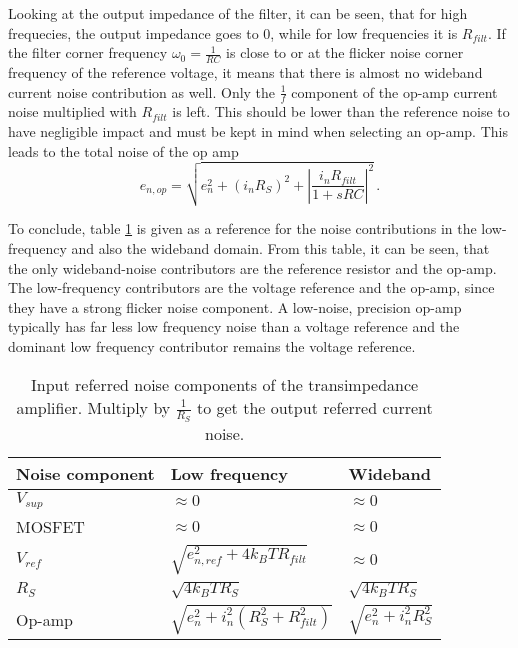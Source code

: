 Looking at the output impedance of the filter, it can be seen, that for high frequecies, the output impedance goes to \num{0}, while for low frequencies it is $R_{filt}$. If the filter corner frequency $\omega_0 = \frac{1}{RC}$ is close to or at the flicker noise corner frequency of the reference voltage, it means that there is almost no wideband current noise contribution as well. Only the $\frac{1}{f}$ component of the op-amp current noise multiplied with $R_{filt}$ is left. This should be lower than the reference noise to have negligible impact and must be kept in mind when selecting an op-amp.
This leads to the total noise of the op amp
\begin{equation}
    e_{n,op} = \sqrt{e_n^2 + (i_n R_S)^2 + \left|\frac{i_n R_{filt}}{1+sRC}\right|^2} \,.
\end{equation}

To conclude, table \ref{tab:current_source_noise_contributers} is given as a reference for the noise contributions in the low-frequency and also the wideband domain. From this table, it can be seen, that the only wideband-noise contributors are the reference resistor and the op-amp. The low-frequency contributors are the voltage reference and the op-amp, since they have a strong flicker noise component. A low-noise, precision op-amp typically has far less low frequency noise than a voltage reference and the dominant low frequency contributor remains the voltage reference.

\begin{table}[ht]
    \centering
    \begin{tabular}{lll}
        \toprule
        Noise component& Low frequency& Wideband \\
        \midrule
        $V_{sup}$ & $\approx 0$ & $\approx 0$\\
        MOSFET & $\approx 0$ & $\approx 0$\\
        $V_{ref}$ & $\sqrt{e_{n,ref}^2 + 4 k_B T R_{filt}} $ & $\approx 0$\\
        $R_S$ & $\sqrt{4 k_B T R_S}$ & $\sqrt{4 k_B T R_S}$\\
        Op-amp & $\sqrt{e_n^2 + i_n^2 (R_S^2 + R_{filt}^2)}$ & $\sqrt{e_n^2 + i_n^2 R_S^2}$\\
        \bottomrule
    \end{tabular}
    \caption{Input referred noise components of the transimpedance amplifier. Multiply by $\frac{1}{R_S}$ to get the output referred current noise.}
    \label{tab:current_source_noise_contributers}
\end{table}

